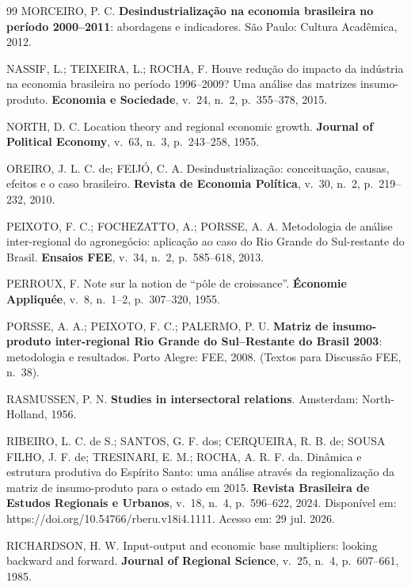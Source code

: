 \documentclass[11pt,a4paper]{article}
\begin{document}
\begin{thebibliography}{99}
MORCEIRO, P. C. \textbf{Desindustrialização na economia brasileira no período
2000--2011}: abordagens e indicadores. São Paulo: Cultura Acadêmica, 2012.

NASSIF, L.; TEIXEIRA, L.; ROCHA, F. Houve redução do impacto da indústria na
economia brasileira no período 1996--2009? Uma análise das matrizes
insumo-produto. \textbf{Economia e Sociedade}, v.~24, n.~2, p.~355--378, 2015.

NORTH, D. C. Location theory and regional economic growth. \textbf{Journal of
Political Economy}, v.~63, n.~3, p.~243--258, 1955.

OREIRO, J. L. C. de; FEIJÓ, C. A. Desindustrialização: conceituação, causas,
efeitos e o caso brasileiro. \textbf{Revista de Economia Política}, v.~30, n.~2,
p.~219--232, 2010.

PEIXOTO, F. C.; FOCHEZATTO, A.; PORSSE, A. A. Metodologia de análise
inter-regional do agronegócio: aplicação ao caso do Rio Grande do Sul-restante do
Brasil. \textbf{Ensaios FEE}, v.~34, n.~2, p.~585--618, 2013.

PERROUX, F. Note sur la notion de ``pôle de croissance''. \textbf{Économie
Appliquée}, v.~8, n.~1--2, p.~307--320, 1955.

PORSSE, A. A.; PEIXOTO, F. C.; PALERMO, P. U. \textbf{Matriz de insumo-produto
inter-regional Rio Grande do Sul--Restante do Brasil 2003}: metodologia e
resultados. Porto Alegre: FEE, 2008. (Textos para Discussão FEE, n.~38).

RASMUSSEN, P. N. \textbf{Studies in intersectoral relations}. Amsterdam:
North-Holland, 1956.

RIBEIRO, L. C. de S.; SANTOS, G. F. dos; CERQUEIRA, R. B. de; SOUSA FILHO, J. F.
de; TRESINARI, E. M.; ROCHA, A. R. F. da. Dinâmica e estrutura produtiva do
Espírito Santo: uma análise através da regionalização da matriz de insumo-produto
para o estado em 2015. \textbf{Revista Brasileira de Estudos Regionais e Urbanos},
v.~18, n.~4, p.~596--622, 2024. Disponível em:
https://doi.org/10.54766/rberu.v18i4.1111. Acesso em: 29 jul. 2026.

RICHARDSON, H. W. Input-output and economic base multipliers: looking backward and
forward. \textbf{Journal of Regional Science}, v.~25, n.~4, p.~607--661, 1985.


\end{thebibliography}
\end{document}
